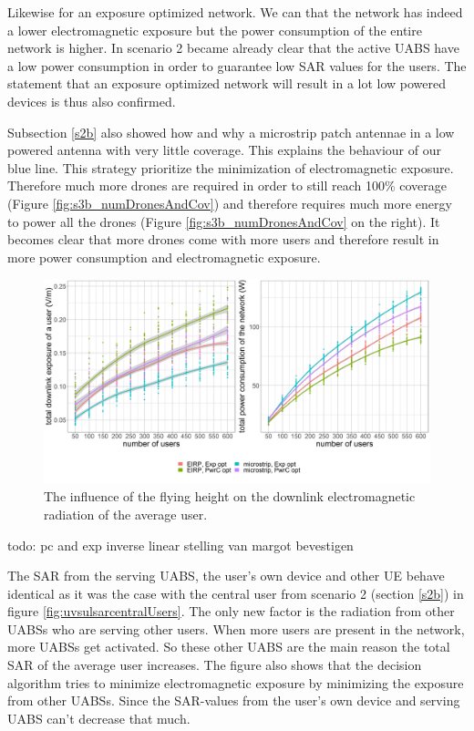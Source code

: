 Likewise for an exposure optimized network. We can that the network has indeed a lower electromagnetic exposure but the power consumption 
of the entire network is higher. In scenario 2 became already clear that the active \gls{UABS} have a low power consumption in order to 
guarantee low \gls{SAR} values for the users.  The statement that an exposure optimized network will result in a lot low powered devices is thus also confirmed.

Subsection \ref{s2b} also showed how and why a microstrip patch antennae in a low powered antenna with very little coverage. This 
explains the behaviour of our blue line. This strategy prioritize the minimization of electromagnetic exposure. Therefore much more 
drones are required in order to still reach 100\% coverage (Figure \ref{fig:s3b_numDronesAndCov}) and therefore requires much more energy 
to power all the drones (Figure \ref{fig:s3b_numDronesAndCov} on the right).
It becomes clear that more drones come with more users  and therefore result in more power consumption and electromagnetic exposure.


\begin{figure}[h!]
  \includegraphics[width=\textwidth]{../results/s3/uvsdlAndPc.png}
  \caption{The influence of the flying height on the downlink electromagnetic radiation of the average user.}
  \label{fig:s3b_dlAndPC}
\end{figure}
todo: pc and exp inverse linear stelling van margot bevestigen

The \gls{SAR} from the serving UABS, the user's own device and other \gls{UE} behave identical as it was the case with the central user from scenario 2 (section \ref{s2b}) 
in figure \ref{fig:uvsulsarcentralUsers}. The only new factor is the radiation from other \gls{UABS}s who are serving other users. When more users 
are present in the network, more \gls{UABS}s get activated. So these other \gls{UABS} are the main reason the total \gls{SAR} of the average user increases.
The figure also shows that the decision algorithm tries to minimize electromagnetic exposure by minimizing the exposure from other \gls{UABS}s. Since the \gls{SAR}-values
from the user's own device and serving \gls{UABS} can't decrease that much.

